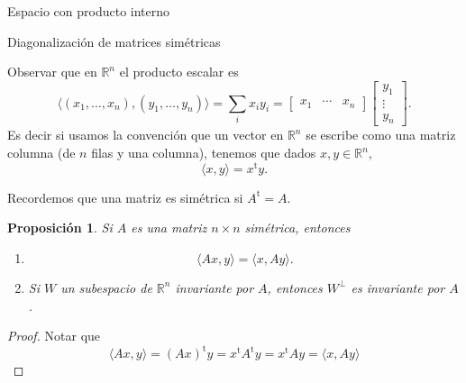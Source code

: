 \documentclass[a4paper,12pt,twoside,spanish]{amsbook}
\newtheorem{proposicion}[teorema]{Proposici\'on}
\theoremstyle{definition}
\newtheorem{definicion}{Definici\'on}[section]
\theoremstyle{remark}
\newcommand{\la}{\langle}
\newcommand{\ra}{\rangle}
\renewcommand{\t}{{\operatorname{t}}}
\newcommand{\R}{\mathbb R}
\begin{document}
\begin{chapter}{Espacio con producto interno}



\begin{section}{Diagonalización de matrices simétricas}
	

	
	
	Observar que en $\R^n$ el producto escalar es 
	\begin{equation*}
		\la (x_1,\ldots,x_n),(y_1,\ldots,y_n)  \ra = \sum_i x_iy_i = \begin{bmatrix} x_1& \cdots &x_n\end{bmatrix}\begin{bmatrix} y_1 \\ \vdots \\ y_n \end{bmatrix}.
	\end{equation*}
	Es decir si usamos la convención que un vector en $\R^n$  se escribe como una matriz columna (de $n$ filas y una columna),  tenemos que dados $x,y \in \R^n$, 
	\begin{equation*}
		\la x,y \ra = x^\t y.
	\end{equation*}
	
	Recordemos que una matriz es simétrica si $A^\t =A$. 
	
\begin{proposicion}
	Si $A$ es una matriz $n \times n$ simétrica, entonces 
	\begin{enumerate}[label=\emph{\alph*})]
		\item 
		\begin{equation*}
		\la Ax,y \ra =  \la x,Ay \ra .
		\end{equation*}
		\item Si $W$ un subespacio de $\R^n$ invariante por $A$, entonces $W^\perp$ es invariante por $A$.
	\end{enumerate}
\end{proposicion}
\begin{proof}
	Notar que
	\begin{equation*}
	\la Ax,y \ra = (Ax)^\t y = x^\t A^\t y  = x^\t A y = \la x,Ay \ra 
	\end{equation*}
\end{proof}
	

\end{section}
\end{chapter}
\end{document}
